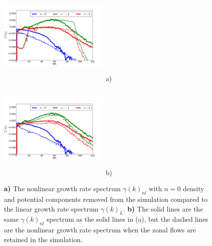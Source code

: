 \documentclass[12pt]{article}
\begin{document}
\begin{figure}
\includegraphics[width=0.48\textwidth,height=50mm]{non0_vs_lin}~a)
\hfil
\includegraphics[width=0.48\textwidth,height=50mm]{non0_vs_withzf}~b)
\hfil
\caption{\textbf{a)} The nonlinear growth rate spectrum $\gamma(k)_{nl}$ with $n=0$ density and potential components removed from the 
simulation compared to the linear growth rate spectrum $\gamma(k)_L$.
\textbf{b)} The solid lines are the same $\gamma(k)_{nl}$ spectrum as the solid lines in (a), but the dashed lines are the nonlinear growth rate spectrum when the zonal flows are retained
in the simulation.}
\label{gamma_no_n0_figs}
\end{figure}
\end{document}
